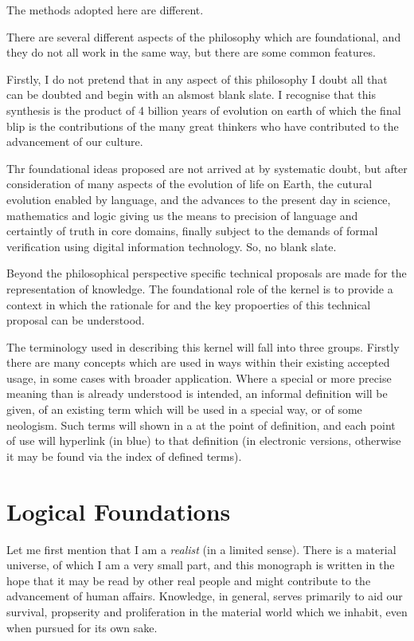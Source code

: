 The methods adopted here are different.

There are several different aspects of the philosophy which are foundational, and they do not all work in the same way, but there are some common features.

Firstly, I do not pretend that in any aspect of this philosophy I doubt all that can be doubted and begin with an alsmost blank slate.
I recognise that this synthesis is the product of 4 billion years of evolution on earth of which the final blip is the contributions of the many great thinkers who have contributed to the advancement of our culture.

Thr foundational ideas proposed are not arrived at by systematic doubt, but after consideration of many aspects of the evolution of life on Earth, the cutural evolution enabled by language, and the advances to the present day in science, mathematics and logic giving us the means to precision of language and certaintly of truth in core domains, finally subject to the demands of formal verification using digital information technology.
So, no blank slate.

Beyond the philosophical perspective specific technical proposals are made for the representation of knowledge.
The foundational role of the kernel is to provide a context in which the rationale for and the key propoerties of this technical proposal can be understood.

The terminology used in describing this kernel will fall into three 
groups.
Firstly there are many concepts which are used in ways within their existing accepted usage, in some cases with broader application.
Where a special or more precise meaning than is already understood   is intended, an informal definition will be given, of an existing term which will be used in a special way, or of some neologism.
Such terms will shown in a  at the point of definition, and each point of use will hyperlink (in blue) to that definition (in electronic versions, otherwise it may be found via the index of defined terms).

\section{Logical Foundations}

Let me first mention that I am a \emph{realist} (in a limited sense).
There is a material universe, of which I am a very small part, and this monograph is written in the hope that it may be read by other real people and might contribute to the advancement of human affairs.
Knowledge, in general, serves primarily to aid our survival, propserity and proliferation in the material world which we inhabit, even when pursued for its own sake.

